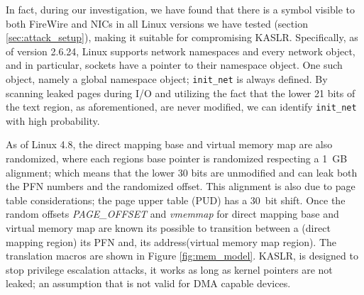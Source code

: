 In fact, during our investigation, we have found that there is a symbol visible to both FireWire and NICs in all Linux versions we have tested (section \ref{sec:attack_setup}), making it suitable for compromising KASLR. Specifically, as of version 2.6.24, Linux supports network namespaces and every network object, and in particular, sockets have a pointer to their namespace object. One such object, namely a global namespace object; \texttt{init\_net} is always defined. By scanning leaked pages during I/O and utilizing the fact that the lower 21 bits of the text region, as aforementioned, are never modified, we can identify \texttt{init\_net} with high probability.

As of Linux 4.8, the direct mapping base and virtual memory map are also randomized, where each regions base pointer is randomized respecting a 1~GB alignment; which means that the lower 30 bits are unmodified and can leak both the PFN numbers and the randomized offset. This alignment is also due to page table considerations; the page upper table (PUD) has a 30~bit shift. Once the random offsets \textit{PAGE\_OFFSET} and \textit{vmemmap} for direct mapping base and virtual memory map are known its possible to transition between a \kva(direct mapping region) its PFN and, its \page{} address(virtual memory map region). The translation macros are shown in Figure \ref{fig:mem_model}. KASLR, is designed to stop privilege escalation attacks, it works as long as kernel pointers are not leaked; an assumption that is not valid for DMA capable devices.

